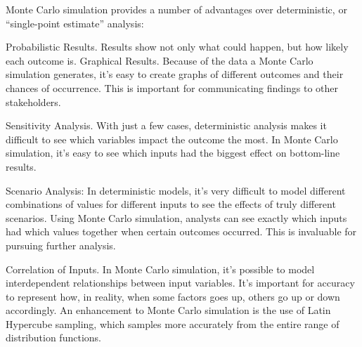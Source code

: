 Monte Carlo simulation provides a number of advantages over deterministic, or “single-point estimate” analysis:

Probabilistic Results. Results show not only what could happen, but how likely each outcome is.
Graphical Results. Because of the data a Monte Carlo simulation generates, it’s easy to create graphs of different outcomes and their chances of occurrence.  This is important for communicating findings to other stakeholders.

Sensitivity Analysis. With just a few cases, deterministic analysis makes it difficult to see which variables impact the outcome the most.  In Monte Carlo simulation, it’s easy to see which inputs had the biggest effect on bottom-line results.

Scenario Analysis: In deterministic models, it’s very difficult to model different combinations of values for different inputs to see the effects of truly different scenarios.  Using Monte Carlo simulation, analysts can see exactly which inputs had which values together when certain outcomes occurred.  This is invaluable for pursuing further analysis.

Correlation of Inputs. In Monte Carlo simulation, it’s possible to model interdependent relationships between input variables.  It’s important for accuracy to represent how, in reality, when some factors goes up, others go up or down accordingly.
An enhancement to Monte Carlo simulation is the use of Latin Hypercube sampling, which samples more accurately from the entire range of distribution functions.
